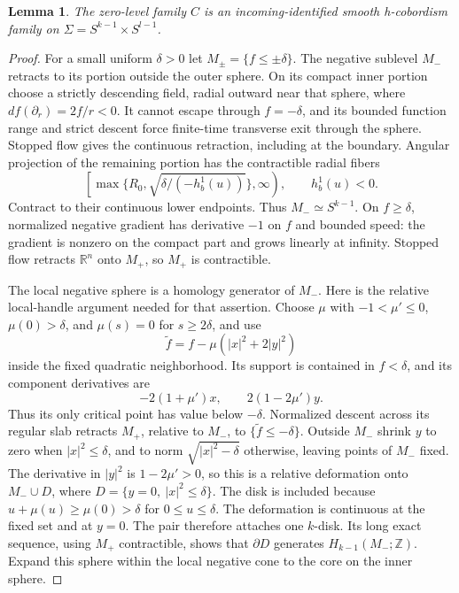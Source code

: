 \documentclass[11pt]{article}
\newtheorem{lemma}[theorem]{Lemma}
\newcommand{\R}{\mathbb R}
\newcommand{\Z}{\mathbb Z}
\begin{document}
\begin{lemma}\label{lem:hcob}
The zero-level family $C$ is an incoming-identified smooth h-cobordism
family on $\Sigma=S^{k-1}\times S^{l-1}$.
\end{lemma}
\begin{proof}
For a small uniform $\delta>0$ let $M_\pm=\{f\leq\pm\delta\}$.
The negative sublevel $M_-$ retracts to its portion outside the outer
sphere. On its compact inner portion choose a strictly descending field,
radial outward near that sphere, where $df(\partial_r)=2f/r<0$.
It cannot escape through $f=-\delta$, and its bounded function range
and strict descent force finite-time transverse exit through the sphere.
Stopped flow gives the continuous retraction, including at the boundary.
Angular projection of the remaining portion has the contractible radial
fibers
\[
 \left[\max\{R_0,\sqrt{\delta/(-h_b^1(u))}\},\infty\right),
 \qquad h_b^1(u)<0.
\]
Contract to their continuous lower endpoints. Thus $M_-\simeq S^{k-1}$.
On $f\geq\delta$, normalized negative gradient has derivative $-1$
on $f$ and bounded speed: the gradient is nonzero on the compact
part and grows linearly at infinity. Stopped flow retracts $\R^n$
onto $M_+$, so $M_+$ is contractible.

The local negative sphere is a homology generator of $M_-$.
Here is the relative local-handle argument needed for that assertion.
Choose $\mu$ with $-1<\mu'\leq0$, $\mu(0)>\delta$, and $\mu(s)=0$
for $s\geq2\delta$, and use
\[
 \widetilde f=f-\mu(|x|^2+2|y|^2)
\]
inside the fixed quadratic neighborhood. Its support is contained
in $f<\delta$, and its component derivatives are
\[
 -2(1+\mu')x,\qquad 2(1-2\mu')y.                       \tag{7}
\]
Thus its only critical point has value below $-\delta$.
Normalized descent across its regular slab retracts $M_+$, relative
to $M_-$, to $\{\widetilde f\leq-\delta\}$.
Outside $M_-$ shrink $y$ to zero when $|x|^2\leq\delta$, and to norm
$\sqrt{|x|^2-\delta}$ otherwise, leaving points of $M_-$ fixed.
The derivative in $|y|^2$ is $1-2\mu'>0$, so this is a relative
deformation onto $M_-\cup D$, where
$D=\{y=0,\ |x|^2\leq\delta\}$.
The disk is included because
$u+\mu(u)\geq\mu(0)>\delta$ for $0\leq u\leq\delta$.
The deformation is continuous at the fixed set and at $y=0$.
The pair therefore attaches one $k$-disk. Its long exact sequence,
using $M_+$ contractible, shows that $\partial D$ generates
$H_{k-1}(M_-;\Z)$. Expand this sphere within the local negative cone
to the core on the inner sphere.


\end{proof}
\end{document}
